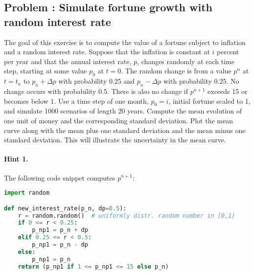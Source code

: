 \documentclass[graybox,sectrefs,envcountresetchap,open=right,final]{svmonodo}
\newenvironment{doconceexercise}{}{}
\newcounter{doconceexercisecounter}
\begin{document}
\begin{doconceexercise}

\subsection*{Problem \thedoconceexercisecounter: Simulate fortune growth with random interest rate}

\label{decay:app:exer:interest}

The goal of this exercise is to compute the value of a fortune subject
to inflation and a random interest rate.
Suppose that the inflation is constant at $i$ percent per year and that the
annual interest rate, $p$, changes randomly at each time step,
starting at some value $p_0$ at $t=0$.
The random change is from a value $p^n$ at $t=t_n$ to
$p_n +\Delta p$ with probability 0.25 and $p_n -\Delta p$ with probability 0.25.
No change occurs with probability 0.5. There is also no change if
$p^{n+1}$ exceeds 15 or becomes below 1.
Use a time step of one month, $p_0=i$, initial fortune scaled to 1,
and simulate 1000 scenarios of
length 20 years. Compute the mean evolution of one unit of money and the
corresponding
standard deviation. Plot the mean curve along with the mean plus one
standard deviation and the mean minus one standard deviation. This will
illustrate the uncertainty in the mean curve.


\paragraph{Hint 1.}
The following code snippet computes $p^{n+1}$:
\begin{lstlisting}[language=Python,style=blue1_bluegreen]
import random

def new_interest_rate(p_n, dp=0.5):
    r = random.random()  # uniformly distr. random number in [0,1)
    if 0 <= r < 0.25:
        p_np1 = p_n + dp
    elif 0.25 <= r < 0.5:
        p_np1 = p_n - dp
    else:
        p_np1 = p_n
    return (p_np1 if 1 <= p_np1 <= 15 else p_n)
\end{lstlisting}




\end{doconceexercise}
\end{document}
